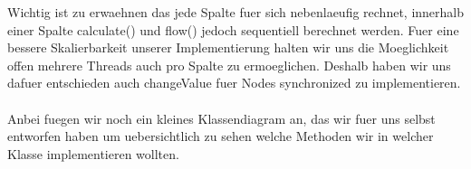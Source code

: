 \documentclass[12pt]{article}
\begin{document}
Wichtig ist zu erwaehnen das jede Spalte fuer sich nebenlaeufig rechnet, innerhalb einer Spalte calculate() und flow() jedoch sequentiell berechnet werden. Fuer eine bessere Skalierbarkeit unserer Implementierung halten wir uns die Moeglichkeit offen mehrere Threads auch pro Spalte zu ermoeglichen. Deshalb haben wir uns dafuer entschieden auch changeValue fuer Nodes synchronized zu implementieren.\\\\


Anbei fuegen wir noch ein kleines Klassendiagram an, das wir fuer uns selbst entworfen haben um uebersichtlich zu sehen welche Methoden wir in welcher Klasse implementieren wollten.





\end{document}
